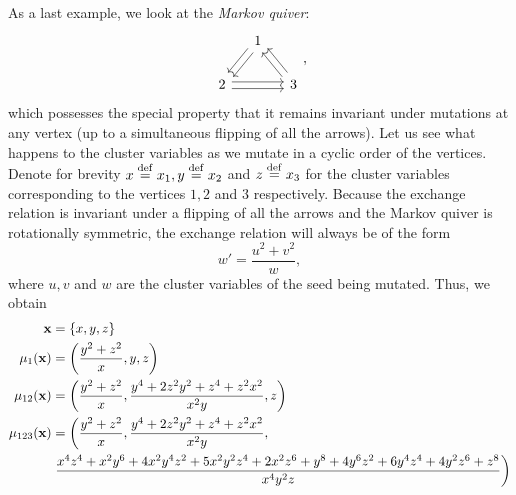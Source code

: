 \begin{example}\label{exmp:markov_quiver}
	As a last example, we look at the \emph{Markov quiver}:
	\begin{equation*}
		\begin{tikzcd}[column sep= small]
			& 1 \ar[ld, shift left] \ar[ld, shift right]\\
			2 \ar[rr, shift left] \ar[rr, shift right] && 3 \ar[lu, shift left] \ar[lu, shift right]
		\end{tikzcd},
	\end{equation*}
	which possesses the special property that it remains invariant under mutations at any
	vertex (up to a simultaneous flipping of all the arrows). Let us see what happens to
	the cluster variables as we mutate in a cyclic order of the vertices. Denote for
	brevity $x \overset{\mathrm{def}}{=} x_1, y \overset{\mathrm{def}}{=} x_2$ and $z \overset{\mathrm{def}}{=} x_3$ for the cluster variables
	corresponding to the vertices $1,2$ and $3$ respectively. Because the exchange relation
	is invariant under a flipping of all the arrows and the Markov quiver is rotationally
	symmetric, the exchange relation will always be of the form
	\begin{equation}\label{eq:markov_exchange_relation}
		w' = \frac{u^2 + v^2}{w},
	\end{equation}
	where $u, v$ and $w$ are the cluster variables of the seed being mutated. Thus, we
	obtain
	\begin{align*}
		\bx            & = \{x, y, z\}                                                                                                                                                                              \\
		\mu_1(\bx)     & = \left(\frac{y^2 + z^2}{x}, y, z\right)                                                                                                                                                   \\
		\mu_{12}(\bx)  & = \left(\frac{y^2 + z^2}{x}, \frac{y^4 + 2 z^2y^2 +z^4 + z^2x^2 }{x^2y}, z\right)                                                                                                          \\
		\mu_{123}(\bx) & = \left(\frac{y^2 + z^2}{x}, \frac{y^4 + 2 z^2y^2 +z^4 + z^2x^2 }{x^2y},\right.                                                                                                            \\
		               & \left. \frac{x^{4} z^{4} + x^{2} y^{6} + 4 x^{2} y^{4} z^{2} + 5 x^{2} y^{2} z^{4} + 2 x^{2} z^{6} + y^{8} + 4 y^{6} z^{2} + 6 y^{4} z^{4} + 4 y^{2} z^{6} + z^{8}}{x^{4} y^{2} z} \right)

\end{align*}
\end{example}
